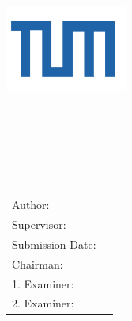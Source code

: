 \begin{titlepage}
\begin{center}
\centering
\vspace{50mm}
\includegraphics[width=40mm]{./includes/logo/tum} \\
\vspace{10mm}
{\Huge\MakeUppercase{\getUniversity{}}} \\
\vspace{15mm}
{\huge\MakeUppercase{\getFaculty{}}} \\
\vspace{20mm}
{\Large \getDoctype{}} \\
\vspace{15mm}
{\huge\bfseries \getTitle{}} \\
\vspace{15mm}
\end{center}
\getDoctypeger{} \\
\vspace{15mm}

\begin{center}
\begin{tabular}{l l}
Author: & \getAuthor{} \\
Supervisor: & \getSupervisor{} \\
Submission Date: & \getSubmissionDate{} \\ \hline
Chairman: & \getChairman{} \\
1. Examiner: & \getFirstExaminer{} \\
2. Examiner: & \getSecondExaminer{} \\
\end{tabular}
\end{center}
\end{titlepage}